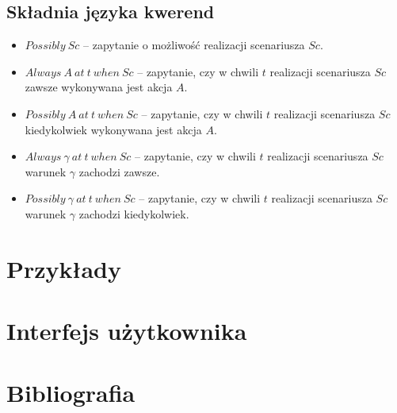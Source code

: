 \documentclass{article}
\begin{document}
\subsection{Składnia języka kwerend}
\begin{itemize}
    \item $Possibly\ Sc$ – zapytanie o możliwość realizacji scenariusza $Sc$.
    \item $Always\ A\ at\ t\ when\ Sc$ – zapytanie, czy w chwili $t$ realizacji scenariusza $Sc$ zawsze wykonywana jest akcja $A$.
    \item $Possibly\ A\ at\ t\ when\ Sc$ – zapytanie, czy w chwili $t$ realizacji scenariusza $Sc$ kiedykolwiek wykonywana jest akcja $A$.
    \item $Always\ \gamma\ at\ t\ when\ Sc$ – zapytanie, czy w chwili $t$ realizacji scenariusza $Sc$ warunek $\gamma$ zachodzi zawsze.
    \item $Possibly\ \gamma\ at\ t\ when\ Sc$ – zapytanie, czy w chwili $t$ realizacji scenariusza $Sc$ warunek $\gamma$ zachodzi kiedykolwiek.
\end{itemize}

\section{Przykłady}

\section{Interfejs użytkownika}

\section{Bibliografia}
\end{document}
